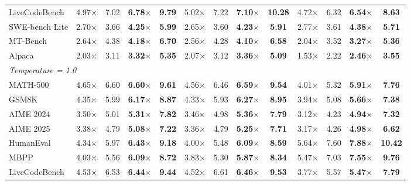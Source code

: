 \begin{table}[t]
{\begin{tabular}{l rcrc rcrc rcrc}
LiveCodeBench & 4.97$\times$ & 7.02 & \textbf{6.78$\times$} & \textbf{9.79} & 5.02$\times$ & 7.22 & \textbf{7.10$\times$} & \textbf{10.28} & 4.72$\times$ & 6.32 & \textbf{6.54$\times$} & \textbf{8.63} \\
SWE-bench Lite & 2.70$\times$ & 3.66 & \textbf{4.25$\times$} & \textbf{5.99} & 2.65$\times$ & 3.60 & \textbf{4.23$\times$} & \textbf{5.91} & 2.77$\times$ & 3.61 & \textbf{4.38$\times$} & \textbf{5.71} \\
MT-Bench & 2.64$\times$ & 4.38 & \textbf{4.18$\times$} & \textbf{6.70} & 2.56$\times$ & 4.28 & \textbf{4.10$\times$} & \textbf{6.58} & 2.04$\times$ & 3.52 & \textbf{3.27$\times$} & \textbf{5.36} \\
Alpaca & 2.03$\times$ & 3.11 & \textbf{3.32$\times$} & \textbf{5.35} & 2.07$\times$ & 3.12 & \textbf{3.36$\times$} & \textbf{5.09} & 1.53$\times$ & 2.22 & \textbf{2.46$\times$} & \textbf{3.55} \\
\midrule
\multicolumn{13}{l}{\textit{Temperature = 1.0}} \\
MATH-500 & 4.65$\times$ & 6.60 & \textbf{6.60$\times$} & \textbf{9.61} & 4.56$\times$ & 6.46 & \textbf{6.59$\times$} & \textbf{9.54} & 4.01$\times$ & 5.32 & \textbf{5.91$\times$} & \textbf{7.76} \\
GSM8K & 4.35$\times$ & 5.99 & \textbf{6.17$\times$} & \textbf{8.87} & 4.33$\times$ & 5.93 & \textbf{6.27$\times$} & \textbf{8.95} & 3.94$\times$ & 5.08 & \textbf{5.66$\times$} & \textbf{7.38} \\
AIME 2024 & 3.50$\times$ & 5.01 & \textbf{5.31$\times$} & \textbf{7.82} & 3.46$\times$ & 4.98 & \textbf{5.36$\times$} & \textbf{7.79} & 3.12$\times$ & 4.23 & \textbf{4.94$\times$} & \textbf{7.32} \\
AIME 2025 & 3.38$\times$ & 4.79 & \textbf{5.08$\times$} & \textbf{7.22} & 3.36$\times$ & 4.79 & \textbf{5.25$\times$} & \textbf{7.71} & 3.17$\times$ & 4.26 & \textbf{4.98$\times$} & \textbf{6.62} \\
HumanEval & 4.34$\times$ & 5.97 & \textbf{6.43$\times$} & \textbf{9.18} & 4.00$\times$ & 5.48 & \textbf{6.09$\times$} & \textbf{8.59} & 5.64$\times$ & 7.60 & \textbf{7.88$\times$} & \textbf{10.42} \\
MBPP & 4.03$\times$ & 5.56 & \textbf{6.09$\times$} & \textbf{8.72} & 3.83$\times$ & 5.30 & \textbf{5.87$\times$} & \textbf{8.34} & 5.47$\times$ & 7.03 & \textbf{7.55$\times$} & \textbf{9.76} \\
LiveCodeBench & 4.53$\times$ & 6.53 & \textbf{6.44$\times$} & \textbf{9.44} & 4.52$\times$ & 6.61 & \textbf{6.46$\times$} & \textbf{9.53} & 3.77$\times$ & 5.57 & \textbf{5.47$\times$} & \textbf{7.79} \\

\end{tabular}}
\end{table}
